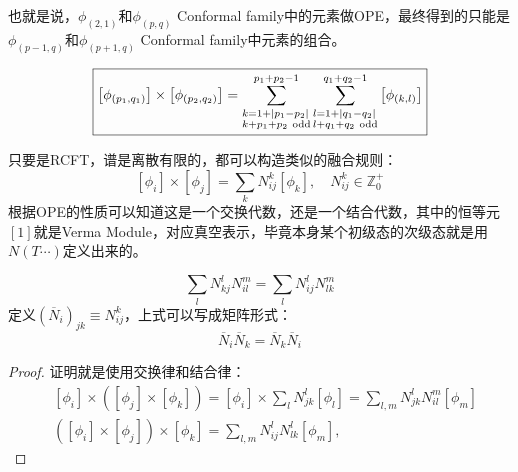 也就是说，$\phi_{(2,1)}$和$\phi_{(p,q)}$ Conformal family中的元素做OPE，最终得到的只能是$\phi_{(p-1,q)}$和$\phi_{(p+1,q)}$ Conformal family中元素的组合。
\begin{theorem}
	\begin{equation}
		\boxed{
			\left[\phi_{(p_1,q_1)}\right]\times \left[\phi_{(p_2,q_2)}\right]=\sum^{p_1+p_2-1}_{\begin{subarray}{l}
					k=1+|p_1-p_2|\\k+p_1+p_2\mathrm{~} \text{odd}\end{subarray}}\sum^{q_1+q_2-1}_{\begin{subarray}{l}
					l=1+|q_1-q_2|\\l+q_1+q_2\mathrm{~} \text{odd}\end{subarray}}\left[\phi_{(k,l)}\right]
		}
	\end{equation}
\end{theorem}
只要是RCFT，谱是离散有限的，都可以构造类似的融合规则：
\begin{equation}
	\boxed{
		[\left.\phi_i\right.]\times[\left.\phi_j\right.]=\sum_kN_{ij}^k\left[\left.\phi_k\right.\right],\quad N_{ij}^k\in\mathbb{Z}^+_0
	}
\end{equation}
根据OPE的性质可以知道这是一个交换代数，还是一个结合代数，其中的恒等元$[1]$就是Verma Module，对应真空表示，毕竟本身某个初级态的次级态就是用$N(T\cdots)$定义出来的。
\begin{theorem}
	\begin{equation}
		\boxed{
			\sum_lN_{kj}^lN_{il}^m=\sum_lN_{ij}^lN_{lk}^m
		}
	\end{equation}
	定义$(\overline{N}_i)_{jk}\equiv N_{ij}^k$，上式可以写成矩阵形式：
	\begin{equation}
		\boxed{
			\overline{N}_i\overline{N}_k=\overline{N}_k\overline{N}_i
		}
	\end{equation}
\end{theorem}
\begin{proof}
	证明就是使用交换律和结合律：
	\begin{equation}
		\begin{aligned}&\left[\phi_i\right]\times\left(\left[\phi_j\right]\times\left[\phi_k\right]\right)=\left[\phi_i\right]\times\sum_{l}N_{jk}^{l}\left[\phi_l\right]=\sum_{l,m}N_{jk}^{l}N_{il}^{m}\left[\phi_m\right]\\&\left(\left[\phi_i\right]\times\left[\phi_j\right]\right)\times\left[\phi_k\right]=\sum_{l,m}N_{ij}^{l}N_{lk}^{l}\left[\phi_m\right],\end{aligned}
	\end{equation}
\end{proof}
